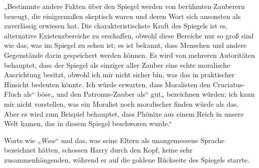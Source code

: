 „Bestimmte andere Fakten über den Spiegel werden von berühmten Zauberern bezeugt, die einigermaßen skeptisch waren und deren Wort sich ansonsten als zuverlässig erwiesen hat. Die charakteristischste Kraft des Spiegels ist es, alternative Existenzbereiche zu erschaffen, obwohl diese Bereiche nur so groß sind wie das, was im Spiegel zu sehen ist; es ist bekannt, dass Menschen und andere Gegenstände darin gespeichert werden können. Es wird von mehreren Autoritäten behauptet, dass der Spiegel als einziger aller Zauber eine echte moralische Ausrichtung besitzt, obwohl ich mir nicht sicher bin, was das in praktischer Hinsicht bedeuten könnte. Ich würde erwarten, dass Moralisten den Cruciatus-Fluch als“ böse„ und den Patronus-Zauber als“ gut„ bezeichnen würden; ich kann mir nicht vorstellen, was ein Moralist noch moralischer finden würde als das. Aber es wird zum Beispiel behauptet, dass Phönixe aus einem Reich in unsere Welt kamen, das in diesem Spiegel beschworen wurde.“

Worte wie „\emph{Wow}“ und das, was seine Eltern als unangemessene Sprache bezeichnet hätten, schossen Harry durch den Kopf, keine sehr zusammenhängenden, während er auf die goldene Rückseite des Spiegels starrte.

